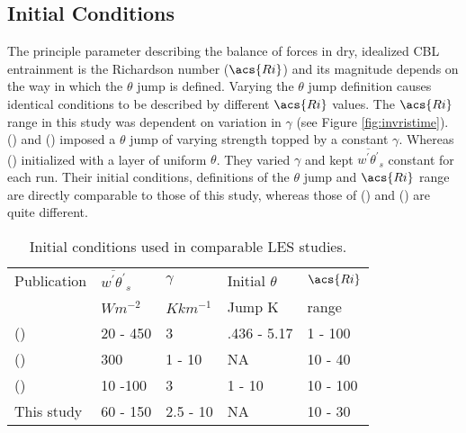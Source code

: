 \subsection{Initial Conditions}

The principle parameter describing the balance of forces in dry, idealized \acs{CBL} entrainment is the Richardson number ($\acs{Ri}$) and its magnitude depends on the way in which the $\theta$ jump is defined.  Varying the $\theta$ jump definition causes identical conditions to be described by different $\acs{Ri}$ values.  The $\acs{Ri}$ range in this study was dependent on variation in $\gamma$ (see Figure \ref{fig:invristime}).  \citeauthor{BrooksFowler2} (\citeyear{BrooksFowler2}) and \citeauthor{SullMoengStev} (\citeyear{SullMoengStev}) imposed a $\theta$ jump of varying strength topped by a constant $\gamma$.  Whereas \citeauthor{FedConzMir04} (\citeyear{FedConzMir04}) initialized with a layer of uniform $\theta$.  They varied $\gamma$ and kept $\overline{w^{'}\theta^{'}}_{s}$ constant for each run.  Their initial conditions, definitions of the $\theta$ jump and $\acs{Ri}$ range are directly comparable to those of this study, whereas those of \citeauthor{BrooksFowler2} (\citeyear{BrooksFowler2}) and \citeauthor{SullMoengStev} (\citeyear{SullMoengStev}) are quite different.\\    

\begin{table}[htbp]
\caption[]{Initial conditions used in comparable \acs{LES} studies.}

    \begin{center}
    \begin{tabular}{ p{4cm} p{1.4cm} p{1.4cm} p{1.7cm} p{1.8cm}}
Publication & $\overline{w^{'}\theta^{'}}_{s}$& $\gamma$& Initial $\theta$ & $\acs{Ri}$ \\ 
& $Wm^{-2}$ & $Kkm^{-1}$ & Jump K & range \\ \hline
      \citeauthor{SullMoengStev} (\citeyear{SullMoengStev}) & 20 - 450& 3  &.436 - 5.17 & 1 - 100\\ %
      \citeauthor{FedConzMir04} (\citeyear{FedConzMir04}) & 300 & 1 - 10 & NA & 10 - 40\\ %
      \citeauthor{BrooksFowler2} (\citeyear{BrooksFowler2}) &  10 -100 &  3& 1 - 10 &10 - 100 \\ %
      This study & 60 - 150 & 2.5 - 10& NA & 10 - 30\\ \hline 
      
    \end{tabular}
\label{table:initconditcomp}   
\end{center}    
\end{table}

